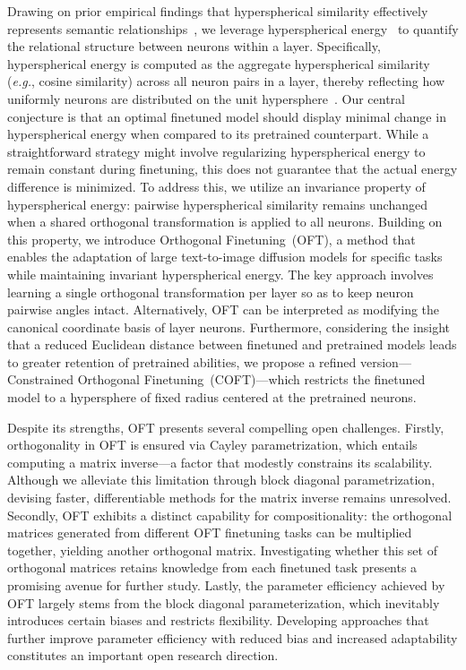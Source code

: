 Drawing on prior empirical findings that hyperspherical similarity effectively represents semantic relationships~\cite{liu2017deep,liu2018decoupled,chen2020angular}, we leverage hyperspherical energy~\cite{liu2018learning} to quantify the relational structure between neurons within a layer. Specifically, hyperspherical energy is computed as the aggregate hyperspherical similarity (\emph{e.g.}, cosine similarity) across all neuron pairs in a layer, thereby reflecting how uniformly neurons are distributed on the unit hypersphere~\cite{liu2021learning}. Our central conjecture is that an optimal finetuned model should display minimal change in hyperspherical energy when compared to its pretrained counterpart. While a straightforward strategy might involve regularizing hyperspherical energy to remain constant during finetuning, this does not guarantee that the actual energy difference is minimized. To address this, we utilize an invariance property of hyperspherical energy: pairwise hyperspherical similarity remains unchanged when a shared orthogonal transformation is applied to all neurons. Building on this property, we introduce Orthogonal Finetuning~(OFT), a method that enables the adaptation of large text-to-image diffusion models for specific tasks while maintaining invariant hyperspherical energy. The key approach involves learning a single orthogonal transformation per layer so as to keep neuron pairwise angles intact. Alternatively, OFT can be interpreted as modifying the canonical coordinate basis of layer neurons. Furthermore, considering the insight that a reduced Euclidean distance between finetuned and pretrained models leads to greater retention of pretrained abilities, we propose a refined version—Constrained Orthogonal Finetuning~(COFT)—which restricts the finetuned model to a hypersphere of fixed radius centered at the pretrained neurons.

Despite its strengths, OFT presents several compelling open challenges. Firstly, orthogonality in OFT is ensured via Cayley parametrization, which entails computing a matrix inverse—a factor that modestly constrains its scalability. Although we alleviate this limitation through block diagonal parametrization, devising faster, differentiable methods for the matrix inverse remains unresolved. Secondly, OFT exhibits a distinct capability for compositionality: the orthogonal matrices generated from different OFT finetuning tasks can be multiplied together, yielding another orthogonal matrix. Investigating whether this set of orthogonal matrices retains knowledge from each finetuned task presents a promising avenue for further study. Lastly, the parameter efficiency achieved by OFT largely stems from the block diagonal parameterization, which inevitably introduces certain biases and restricts flexibility. Developing approaches that further improve parameter efficiency with reduced bias and increased adaptability constitutes an important open research direction.

